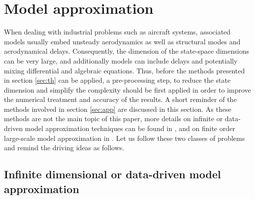 \documentclass[graybox]{svmult}
\begin{document}
\section{Model approximation}\label{sec:mr}

When dealing with industrial problems such as aircraft systems, associated models usually embed unsteady aerodynamics as well as structural modes and aerodynamical delays. Consequently, the dimension of the  state-space dimensions can be very large, and additionally models can include delays and potentially mixing differential and algebraic equations. Thus, before the methods presented in section \ref{sec:th} can be applied, a pre-processing step, to reduce the state dimension and simplify the complexity should be first applied in order to improve the numerical treatment and accuracy of the results. A short reminder of the methods involved in section \ref{sec:app} are discussed in this section. As these methods are not the main topic of this paper, more details on infinite or data-driven model approximation techniques can be found in \cite{AntoulasSurvey:2016,DalmasECC:2016}, and on finite order large-scale model approximation in \cite{AntoulasBook:2005,GugercinSIAM:2008}.  Let us follow these two classes of problems and remind the driving ideas as follows.

\subsection{Infinite  dimensional or data-driven model approximation}\label{sec:app_a}
\end{document}
